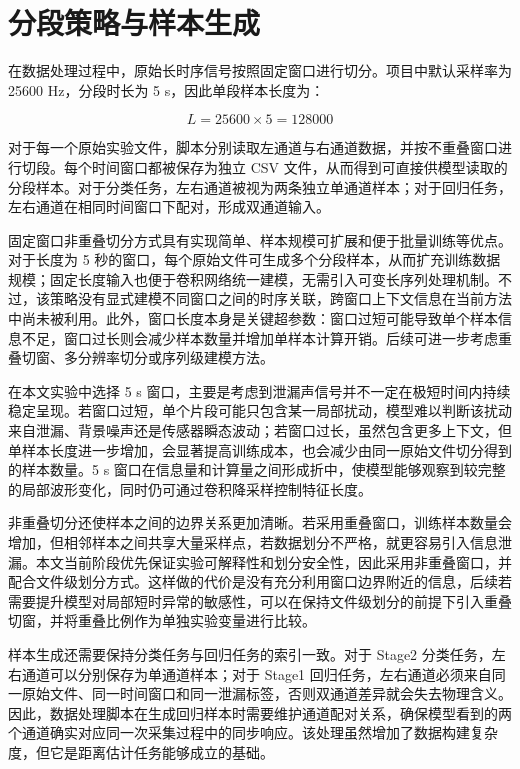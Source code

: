 \section{分段策略与样本生成}

在数据处理过程中，原始长时序信号按照固定窗口进行切分。项目中默认采样率为 25600 Hz，分段时长为 5 s，因此单段样本长度为：

\begin{equation}
L = 25600 \times 5 = 128000
\end{equation}

对于每一个原始实验文件，脚本分别读取左通道与右通道数据，并按不重叠窗口进行切段。每个时间窗口都被保存为独立 CSV 文件，从而得到可直接供模型读取的分段样本。对于分类任务，左右通道被视为两条独立单通道样本；对于回归任务，左右通道在相同时间窗口下配对，形成双通道输入。

固定窗口非重叠切分方式具有实现简单、样本规模可扩展和便于批量训练等优点。对于长度为 5 秒的窗口，每个原始文件可生成多个分段样本，从而扩充训练数据规模；固定长度输入也便于卷积网络统一建模，无需引入可变长序列处理机制。不过，该策略没有显式建模不同窗口之间的时序关联，跨窗口上下文信息在当前方法中尚未被利用。此外，窗口长度本身是关键超参数：窗口过短可能导致单个样本信息不足，窗口过长则会减少样本数量并增加单样本计算开销。后续可进一步考虑重叠切窗、多分辨率切分或序列级建模方法。

在本文实验中选择 5 s 窗口，主要是考虑到泄漏声信号并不一定在极短时间内持续稳定呈现。若窗口过短，单个片段可能只包含某一局部扰动，模型难以判断该扰动来自泄漏、背景噪声还是传感器瞬态波动；若窗口过长，虽然包含更多上下文，但单样本长度进一步增加，会显著提高训练成本，也会减少由同一原始文件切分得到的样本数量。5 s 窗口在信息量和计算量之间形成折中，使模型能够观察到较完整的局部波形变化，同时仍可通过卷积降采样控制特征长度。

非重叠切分还使样本之间的边界关系更加清晰。若采用重叠窗口，训练样本数量会增加，但相邻样本之间共享大量采样点，若数据划分不严格，就更容易引入信息泄漏。本文当前阶段优先保证实验可解释性和划分安全性，因此采用非重叠窗口，并配合文件级划分方式。这样做的代价是没有充分利用窗口边界附近的信息，后续若需要提升模型对局部短时异常的敏感性，可以在保持文件级划分的前提下引入重叠切窗，并将重叠比例作为单独实验变量进行比较。

样本生成还需要保持分类任务与回归任务的索引一致。对于 Stage2 分类任务，左右通道可以分别保存为单通道样本；对于 Stage1 回归任务，左右通道必须来自同一原始文件、同一时间窗口和同一泄漏标签，否则双通道差异就会失去物理含义。因此，数据处理脚本在生成回归样本时需要维护通道配对关系，确保模型看到的两个通道确实对应同一次采集过程中的同步响应。该处理虽然增加了数据构建复杂度，但它是距离估计任务能够成立的基础。

